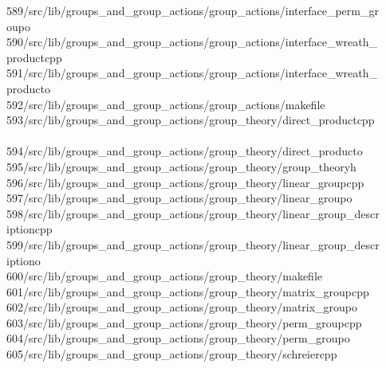 \begin{tabbing}
589\>/src/lib/groups\_and\_group\_actions/group\_actions/interface\_perm\_gr\\[0pt]
\>oupo\\[0pt]
590\>/src/lib/groups\_and\_group\_actions/group\_actions/interface\_wreath\_\\[0pt]
\>productcpp\\[0pt]
591\>/src/lib/groups\_and\_group\_actions/group\_actions/interface\_wreath\_\\[0pt]
\>producto\\[0pt]
592\>/src/lib/groups\_and\_group\_actions/group\_actions/makefile\\[0pt]
593\>/src/lib/groups\_and\_group\_actions/group\_theory/direct\_productcpp\\[0pt]
\>\\[0pt]
594\>/src/lib/groups\_and\_group\_actions/group\_theory/direct\_producto\\[0pt]
595\>/src/lib/groups\_and\_group\_actions/group\_theory/group\_theoryh\\[0pt]
596\>/src/lib/groups\_and\_group\_actions/group\_theory/linear\_groupcpp\\[0pt]
597\>/src/lib/groups\_and\_group\_actions/group\_theory/linear\_groupo\\[0pt]
598\>/src/lib/groups\_and\_group\_actions/group\_theory/linear\_group\_descr\\[0pt]
\>iptioncpp\\[0pt]
599\>/src/lib/groups\_and\_group\_actions/group\_theory/linear\_group\_descr\\[0pt]
\>iptiono\\[0pt]
600\>/src/lib/groups\_and\_group\_actions/group\_theory/makefile\\[0pt]
601\>/src/lib/groups\_and\_group\_actions/group\_theory/matrix\_groupcpp\\[0pt]
602\>/src/lib/groups\_and\_group\_actions/group\_theory/matrix\_groupo\\[0pt]
603\>/src/lib/groups\_and\_group\_actions/group\_theory/perm\_groupcpp\\[0pt]
604\>/src/lib/groups\_and\_group\_actions/group\_theory/perm\_groupo\\[0pt]
605\>/src/lib/groups\_and\_group\_actions/group\_theory/schreiercpp\\[0pt]

\end{tabbing}
